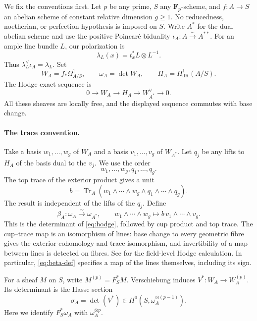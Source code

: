 \documentclass[11pt]{article}
\theoremstyle{definition}\newtheorem{definition}[theorem]{Definition}
\theoremstyle{remark}\newtheorem{remark}[theorem]{Remark}
\newcommand{\FF}{\mathbf F}
\newcommand{\dR}{\mathrm{dR}}
\newcommand{\Tr}{\operatorname{Tr}}
\begin{document}
We fix the conventions first. Let $p$ be any prime, $S$ any $\FF_p$-scheme, and $f:A\to S$ an abelian scheme of constant relative dimension $g\ge1$. No reducedness, noetherian, or perfection hypothesis is imposed on $S$. Write $A^*$ for the dual abelian scheme and use the positive Poincar\'e biduality $\iota_A:A\xrightarrow{\sim}A^{**}$. For an ample line bundle $L$, our polarization is
\begin{equation}\label{eq:polarization-convention}
 \lambda_L(x)=t_x^*L\otimes L^{-1}.
\end{equation}
Thus $\lambda_L^\vee\iota_A=\lambda_L$. Set
\[
 W_A=f_*\Omega^1_{A/S},\qquad \omega_A=\det W_A,
 \qquad H_A=H^1_{\dR}(A/S).
\]
The Hodge exact sequence is
\begin{equation}\label{eq:hodge}
 0\longrightarrow W_A\longrightarrow H_A
 \longrightarrow W_{A^*}^{\vee}\longrightarrow0.
\end{equation}
All these sheaves are locally free, and the displayed sequence commutes with base change.

\paragraph{The trace convention.}
Take a basis $w_1,\ldots,w_g$ of $W_A$ and a basis $v_1,\ldots,v_g$ of $W_{A^*}$. Let $q_j$ be any lifts to $H_A$ of the basis dual to the $v_j$. We use the order
\begin{equation}\label{eq:hodge-first}
 w_1,\ldots,w_g,q_1,\ldots,q_g.
\end{equation}
The top trace of the exterior product gives a unit
\[
 b=\Tr_A(w_1\wedge\cdots\wedge w_g\wedge q_1\wedge\cdots\wedge q_g).
\]
The result is independent of the lifts of the $q_j$. Define
\begin{equation}\label{eq:beta-def}
 \beta_A:\omega_A\xrightarrow{\sim}\omega_{A^*},\qquad
 w_1\wedge\cdots\wedge w_g\longmapsto b\,v_1\wedge\cdots\wedge v_g.
\end{equation}
This is the determinant of \eqref{eq:hodge}, followed by cup product and top trace. The cup--trace map is an isomorphism of lines: base change to every geometric fibre gives the exterior-cohomology and trace isomorphism, and invertibility of a map between lines is detected on fibres. See \citet[Proposition~7.27 and Corollaries~7.29--7.30, pp.~108--109]{EGM} for the field-level Hodge calculation. In particular, \eqref{eq:beta-def} specifies a map of the lines themselves, including its sign.

For a sheaf $M$ on $S$, write $M^{(p)}=F_S^*M$. Verschiebung induces $V^*:W_A\to W_A^{(p)}$. Its determinant is the Hasse section
\begin{equation}\label{eq:hasse}
 \sigma_A=\det(V^*)\in H^0(S,\omega_A^{\otimes(p-1)}).
\end{equation}
Here we identify $F_S^*\omega_A$ with $\omega_A^{\otimes p}$.
\end{document}
